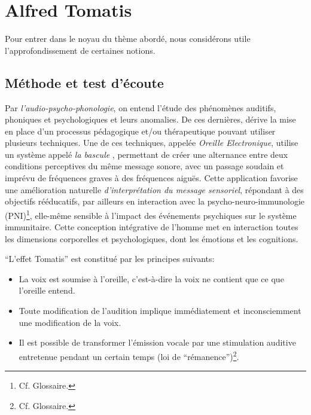 \chapter{Alfred Tomatis}


Pour entrer dans le noyau du thème abordé, nous considérons utile
l'approfondissement de certaines notions.
\section{Méthode et test d'écoute}

Par {\textit{l'audio-psycho-phonologie}}, on entend l'étude des
phénomènes auditifs, phoniques et psychologiques et leurs anomalies.
De ces dernières,  dérive la mise en place d'un processus pédagogique
et/ou thérapeutique pouvant
utiliser plusieurs techniques.
Une de ces techniques,
  appelée
\label{outil_oreille_electro}
\textit{Oreille Electronique}, utilise
un système appelé \textit{ la
bascule} \autocite{escera-key}, permettant de créer une alternance entre deux conditions perceptives
du même message sonore, avec un passage soudain et imprévu de fréquences graves à des
fréquences aiguës.
Cette application favorise une amélioration naturelle \emph{d'interprétation du message
sensoriel}, répondant à des objectifs rééducatifs, par ailleurs en
interaction avec la psycho-neuro-immunologie (\gls{PNI})\footnote{Cf. Glossaire.}, elle-même sensible à
l'impact des événements psychiques sur le système immunitaire.
Cette conception intégrative de l'homme met en interaction toutes les
dimensions corporelles et psychologiques, dont les émotions et les cognitions.


``L'effet Tomatis'' est constitué par les principes suivants:
\begin{itemize}
	\item La voix est soumise à l'oreille, c'est-à-dire la voix ne contient que ce que l'oreille entend.
	\item Toute modification de l'audition implique immédiatement
          et inconsciemment une
          modification de la voix.
	\item Il est possible de transformer l'émission vocale par une stimulation
auditive
		entretenue pendant un certain temps (loi de
               ``\gls{rémanence}'')\footnote{Cf. Glossaire.}.

\end{itemize}

